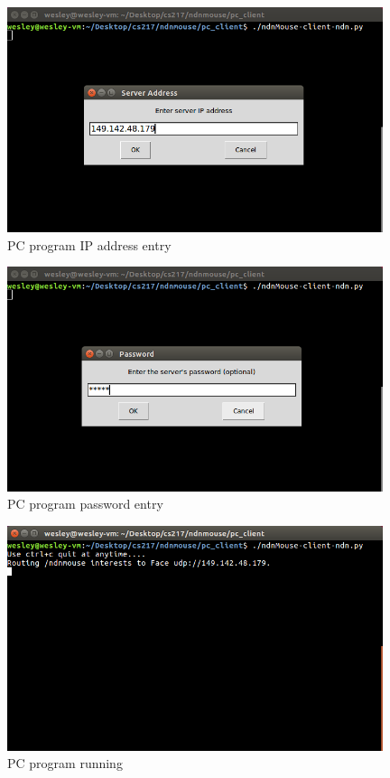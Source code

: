 \documentclass{sig-alternate}
\renewcommand\_{\textunderscore\allowbreak}  %
\begin{document}
\begin{figure}[ht]
	\hypertarget{fig:client1}{}
	\centering
	\caption{PC program IP address entry}
	\includegraphics[width=11cm]{screenshots/client1}
\end{figure}

\begin{figure}[ht]
	\hypertarget{fig:client2}{}
	\centering
	\caption{PC program password entry}
	\includegraphics[width=11cm]{screenshots/client2}
\end{figure}

\begin{figure}[ht]
	\hypertarget{fig:client3}{}
	\centering
	\caption{PC program running}
	\includegraphics[width=11cm]{screenshots/client3}
\end{figure}
\end{document}
